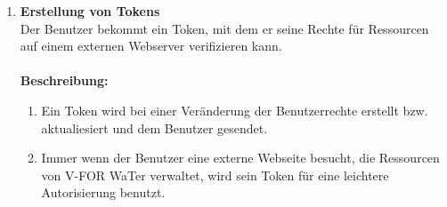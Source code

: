 \documentclass[parskip=full,11pt]{scrartcl}
\def\threedigits#1{%
  \ifnum#1<10 0\fi
  \ifnum#1<1 0\fi
  \number#1}
\begin{document}
\begin{enumerate}[label={\textbf{/F\protect\threedigits{\theenumi}0/}}, leftmargin=*]
\begin{enumerate}[label=(\arabic*), leftmargin=*]
\end{enumerate}
\newpage
\item \label{FAB10} \colorbox{shadecolor}{\textbf{Erstellung von Tokens}}\\ Der Benutzer bekommt ein Token, mit dem er seine Rechte für Ressourcen auf einem externen Webserver verifizieren kann.\\\\
\textbf{Beschreibung:}\\
\begin{enumerate}[label=(\arabic*), leftmargin=*]
\item Ein Token wird bei einer Veränderung der Benutzerrechte erstellt bzw. aktualiesiert und dem Benutzer gesendet. 
\item Immer wenn der Benutzer eine externe Webseite besucht, die Ressourcen von V-FOR WaTer verwaltet, wird sein Token für eine leichtere Autorisierung benutzt. 

\end{enumerate}
\end{enumerate}
\end{document}
